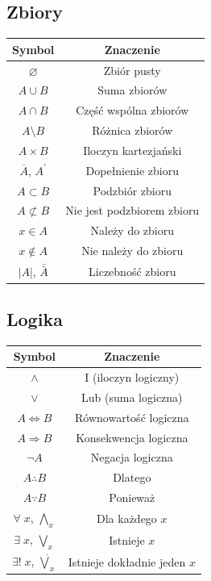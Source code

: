\documentclass[14pt,a4paper]{extarticle}
\begin{document}
\begin{multicols}{2}
\subsection{Zbiory}

\begin{tabular}{*{2}{|c}|}
\hline
{} Symbol & Znaczenie \\
\hline
$\varnothing $ & Zbiór pusty \\
$A\cup B$ & Suma zbiorów \\
$A\cap B$ & Część wspólna zbiorów \\
$A\setminus B$ & Różnica zbiorów \\
$A\times B$ & Iloczyn kartezjański \\
$\overline{A}$, $A^\prime$ & Dopełnienie zbioru \\
$A\subset B$ & Podzbiór zbioru \\
$A\not\subset B$ & Nie jest podzbiorem zbioru \\
$x\in A$ & Należy do zbioru \\
$x\not\in A$ & Nie należy do zbioru \\
$\vert A\vert $, $\bar{\bar{A}}$ & Liczebność zbioru \\
\hline
\end{tabular}

\subsection{Logika}

\begin{tabular}{*{2}{|c}|}
\hline
{} Symbol & Znaczenie \\
\hline
$\land$ & I (iloczyn logiczny)\\
$\lor$ & Lub (suma logiczna) \\
$A\Leftrightarrow B$ & Równowartość logiczna \\
$A\Rightarrow B$ & Konsekwencja logiczna \\
$\lnot A$ & Negacja logiczna \\
$A\therefore B$ & Dlatego \\
$A\because B$ & Ponieważ \\
$\forall \;x$, $\underset{x}{\bigwedge}$ & Dla każdego $x$ \\
$\exists \;x$, $\underset{x}{\bigvee}$ & Istnieje $x$ \\
$\exists! \;x$, $\underset{x}{\dot\bigvee}$ & Istnieje dokładnie jeden $x$ \\
\hline
\end{tabular}

\end{multicols}
\newpage
\renewcommand{\arraystretch}{1.2}
\setlength{\arrayrulewidth}{0.5mm}
\end{document}
